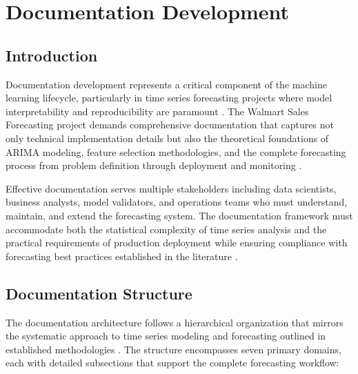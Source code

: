 %
%
%

\chapter{Documentation Development}

\section{Introduction}

Documentation development represents a critical component of the machine learning lifecycle, particularly in time series forecasting projects where model interpretability and reproducibility are paramount \cite{Montgomery:2008}. The Walmart Sales Forecasting project demands comprehensive documentation that captures not only technical implementation details but also the theoretical foundations of ARIMA modeling, feature selection methodologies, and the complete forecasting process from problem definition through deployment and monitoring \cite{Box:2016}.

Effective documentation serves multiple stakeholders including data scientists, business analysts, model validators, and operations teams who must understand, maintain, and extend the forecasting system. The documentation framework must accommodate both the statistical complexity of time series analysis and the practical requirements of production deployment while ensuring compliance with forecasting best practices established in the literature \cite{Montgomery:2008}.

\section{Documentation Structure}

The documentation architecture follows a hierarchical organization that mirrors the systematic approach to time series modeling and forecasting outlined in established methodologies \cite{Montgomery:2008}. The structure encompasses seven primary domains, each with detailed subsections that support the complete forecasting workflow:

